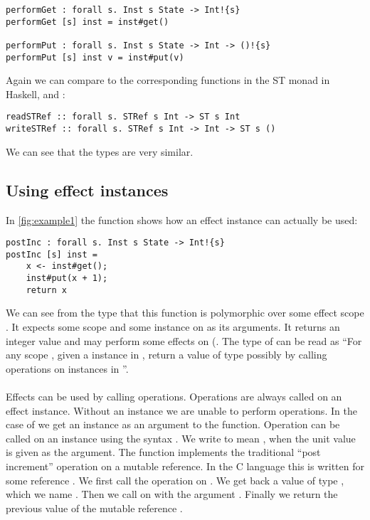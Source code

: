 \begin{verbatim}
performGet : forall s. Inst s State -> Int!{s}
performGet [s] inst = inst#get()

performPut : forall s. Inst s State -> Int -> ()!{s}
performPut [s] inst v = inst#put(v)
\end{verbatim}

Again we can compare to the corresponding functions in the ST monad in Haskell,  and :

\begin{verbatim}
readSTRef :: forall s. STRef s Int -> ST s Int
writeSTRef :: forall s. STRef s Int -> Int -> ST s ()
\end{verbatim}

We can see that the types are very similar.

\subsection{Using effect instances}
\label{subsection:instances}
In \cref{fig:example1} the function  shows how an effect instance can actually be used:
\begin{verbatim}
postInc : forall s. Inst s State -> Int!{s}
postInc [s] inst =
	x <- inst#get();
	inst#put(x + 1);
	return x
\end{verbatim}

We can see from the type that this function is polymorphic over some effect scope .
It expects some scope  and some  instance on  as its arguments.
It returns an integer value and may perform some effects on  (.
The type of  can be read as ``For any scope , given a  instance in , return a value of type  possibly by calling operations on instances in ''.
\\\\
Effects can be used by calling operations.
Operations are always called on an effect instance.
Without an instance we are unable to perform operations.
In the case of  we get an instance as an argument to the function.
Operation can be called on an instance using the syntax .
We write  to mean , when the unit value \ident{()} is given as the argument.
The function  implements the traditional ``post increment'' operation on a mutable reference.
In the C language this is written  for some reference .
We first call the  operation on .
We get back a value of type , which we name .
Then we call  on  with the argument .
Finally we return the previous value of the mutable reference .

